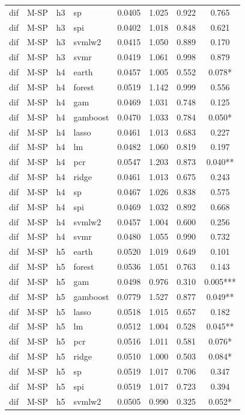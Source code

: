 \begin{ThreePartTable}
\begin{longtable}[t]{llclcccc}
dif & M-SP & h3 & sp & 0.0405 & 1.025 & 0.922 & 0.765\\
dif & M-SP & h3 & spi & 0.0402 & 1.018 & 0.848 & 0.621\\
dif & M-SP & h3 & svmlw2 & 0.0415 & 1.050 & 0.889 & 0.170\\
dif & M-SP & h3 & svmr & 0.0419 & 1.061 & 0.998 & 0.879\\
\addlinespace
dif & M-SP & h4 & earth & 0.0457 & 1.005 & 0.552 & 0.078*\\
dif & M-SP & h4 & forest & 0.0519 & 1.142 & 0.999 & 0.556\\
dif & M-SP & h4 & gam & 0.0469 & 1.031 & 0.748 & 0.125\\
dif & M-SP & h4 & gamboost & 0.0470 & 1.033 & 0.784 & 0.050*\\
dif & M-SP & h4 & lasso & 0.0461 & 1.013 & 0.683 & 0.227\\
dif & M-SP & h4 & lm & 0.0482 & 1.060 & 0.819 & 0.197\\
dif & M-SP & h4 & pcr & 0.0547 & 1.203 & 0.873 & 0.040**\\
dif & M-SP & h4 & ridge & 0.0461 & 1.013 & 0.675 & 0.243\\
dif & M-SP & h4 & sp & 0.0467 & 1.026 & 0.838 & 0.575\\
dif & M-SP & h4 & spi & 0.0469 & 1.032 & 0.892 & 0.668\\
dif & M-SP & h4 & svmlw2 & 0.0457 & 1.004 & 0.600 & 0.256\\
dif & M-SP & h4 & svmr & 0.0480 & 1.055 & 0.990 & 0.732\\
\addlinespace
dif & M-SP & h5 & earth & 0.0520 & 1.019 & 0.649 & 0.101\\
dif & M-SP & h5 & forest & 0.0536 & 1.051 & 0.763 & 0.143\\
dif & M-SP & h5 & gam & 0.0498 & 0.976 & 0.310 & 0.005***\\
dif & M-SP & h5 & gamboost & 0.0779 & 1.527 & 0.877 & 0.049**\\
dif & M-SP & h5 & lasso & 0.0518 & 1.015 & 0.657 & 0.182\\
dif & M-SP & h5 & lm & 0.0512 & 1.004 & 0.528 & 0.045**\\
dif & M-SP & h5 & pcr & 0.0516 & 1.011 & 0.581 & 0.076*\\
dif & M-SP & h5 & ridge & 0.0510 & 1.000 & 0.503 & 0.084*\\
dif & M-SP & h5 & sp & 0.0519 & 1.017 & 0.706 & 0.347\\
dif & M-SP & h5 & spi & 0.0519 & 1.017 & 0.723 & 0.394\\
dif & M-SP & h5 & svmlw2 & 0.0505 & 0.990 & 0.325 & 0.052*\\

\end{longtable}
\end{ThreePartTable}
